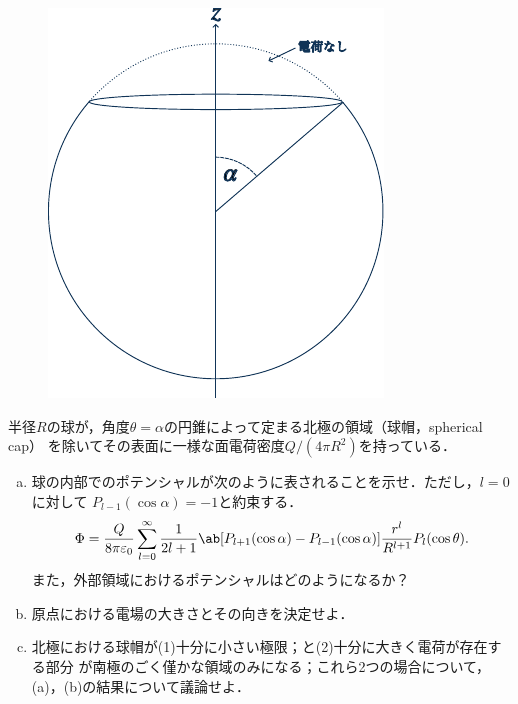 \begin{bx1}
  \begin{figure}
    \centering
    \includegraphics[width=\linewidth]{fig/Jackson3-2.pdf}%
  \end{figure}%
  半径$R$の球が，角度$\theta =  \alpha$の円錐によって定まる北極の領域（球帽，spherical cap）
  を除いてその表面に一様な面電荷密度$Q / (4\pi R^2)$を持っている．
  \begin{enumerate}[(a)]%
    \item  
  球の内部でのポテンシャルが次のように表されることを示せ．ただし，$l = 0$に対して
      $P_{l-1}(\cos\alpha) = -1$と約束する．
      \begin{gather}%
        \Phi = \frac{Q}{8\pi\eps_0} \sum_{l=0}^{\infty} \frac{1}{2l+1} \ab[
          P_{l+1}(\cos\alpha) - P_{l-1}(\cos\alpha)
        ] \frac{r^l}{R^{l+1}} P_l(\cos\theta).
      \end{gather}%
    また，外部領域におけるポテンシャルはどのようになるか？
  \item 
    原点における電場の大きさとその向きを決定せよ．
  \item
    北極における球帽が(1)十分に小さい極限；と(2)十分に大きく電荷が存在する部分
      が南極のごく僅かな領域のみになる；これら2つの場合について，
      (a)，(b)の結果について議論せよ．
  \end{enumerate}%
\end{bx1}

